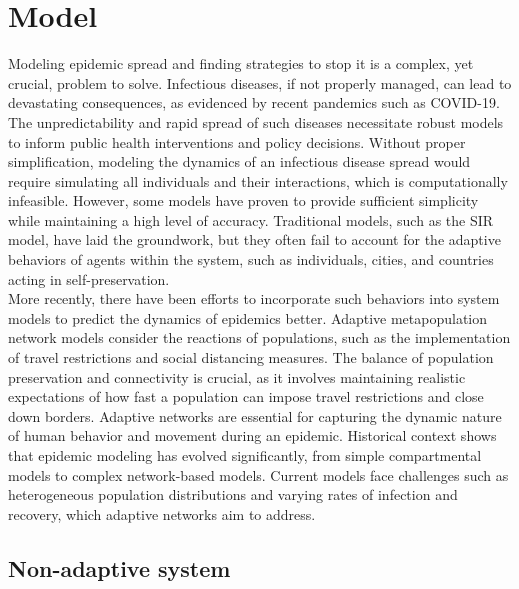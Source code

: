 % 

\section{Model}
Modeling epidemic spread and finding strategies to stop it is a complex, yet crucial, problem to solve. Infectious diseases, if not properly managed, can lead to devastating consequences, as evidenced by recent pandemics such as COVID-19. The unpredictability and rapid spread of such diseases necessitate robust models to inform public health interventions and policy decisions.\cite{calvetti2020metapopulation} Without proper simplification, modeling the dynamics of an infectious disease spread would require simulating all individuals and their interactions, which is computationally infeasible. However, some models have proven to provide sufficient simplicity while maintaining a high level of accuracy. Traditional models, such as the SIR model, have laid the groundwork, but they often fail to account for the adaptive behaviors of agents within the system, such as individuals, cities, and countries acting in self-preservation.\cite{anupriya2022modelling}\\

More recently, there have been efforts to incorporate such behaviors into system models to predict the dynamics of epidemics better. Adaptive metapopulation network models consider the reactions of populations, such as the implementation of travel restrictions and social distancing measures. The balance of population preservation and connectivity is crucial, as it involves maintaining realistic expectations of how fast a population can impose travel restrictions and close down borders. Adaptive networks are essential for capturing the dynamic nature of human behavior and movement during an epidemic.\cite{bajardi2011human} Historical context shows that epidemic modeling has evolved significantly, from simple compartmental models to complex network-based models. Current models face challenges such as heterogeneous population distributions and varying rates of infection and recovery, which adaptive networks aim to address.

\subsection{Non-adaptive system}
